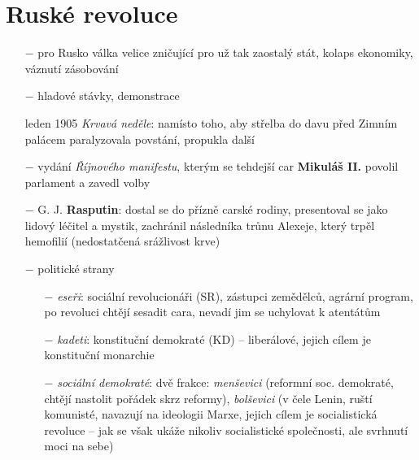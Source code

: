 \documentclass{article}
\begin{document}
\section*{Ruské revoluce}
\begin{itemize}
    \vspace{-0.5em}
    \setlength\itemsep{0.15em}
    \item[$-$] pro Rusko válka velice zničující pro už tak zaostalý stát, kolaps ekonomiky, váznutí zásobování
    \item[$-$] hladové stávky, demonstrace
    \item[leden 1905] \textit{Krvavá neděle}: namísto toho, aby střelba do davu před Zimním palácem paralyzovala povstání, propukla další
    \item[$-$] vydání \textit{Říjnového manifestu}, kterým se tehdejší car \textbf{Mikuláš II.}  povolil parlament a zavedl volby
    \item[$-$] G. J. \textbf{Rasputin}: dostal se do přízně carské rodiny, presentoval se jako lidový léčitel a mystik, zachránil následníka trůnu Alexeje, který trpěl hemofilií (nedostatčená srážlivost krve)
    \item[$-$] politické strany
    \begin{itemize}
        \vspace{-0.5em}
        \setlength\itemsep{0.15em}
        \item[$-$] \textit{eseři}: sociální revolucionáři (SR), zástupci zemědělců, agrární program, po revoluci chtějí sesadit cara, nevadí jim se uchylovat k atentátům
        \item[$-$] \textit{kadeti}: konstituční demokraté (KD) -- liberálové, jejich cílem je konstituční monarchie
        \item[$-$] \textit{sociální demokraté}: dvě frakce: \textit{menševici} (reformní soc. demokraté, chtějí nastolit pořádek skrz reformy), \textit{bolševici} (v čele Lenin, ruští komunisté, navazují na ideologii Marxe, jejich cílem je socialistická revoluce -- jak se však ukáže nikoliv socialistické společnosti, ale svrhnutí moci na sebe)
    \end{itemize}
\end{itemize}
\end{document}
